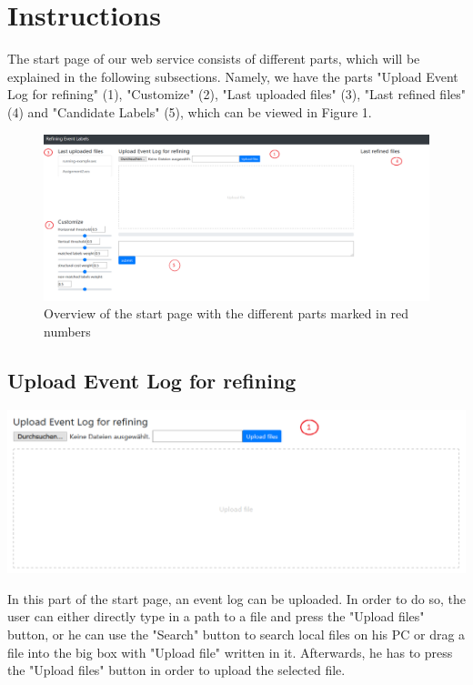 \documentclass[notitlepage]{article}
\begin{document}
\section{Instructions}

The start page of our web service consists of different parts, which will be explained in the following subsections. Namely, we have the parts "Upload Event Log for refining" (1), "Customize" (2), "Last uploaded files" (3), "Last refined files" (4) and "Candidate Labels" (5), which can be viewed in Figure 1.

\begin{figure}[h]
\includegraphics[scale=0.33]{startpage.png}
\caption{Overview of the start page with the different parts marked in red numbers}
\end{figure}

\subsection{Upload Event Log for refining}

\includegraphics[scale=0.5]{uploadEventLog.png}

In this part of the start page, an event log can be uploaded. In order to do so, the user can either directly type in a path to a file and press the "Upload files" button, or he can use the "Search" button to search local files on his PC or drag a file into the big box with "Upload file" written in it. 
Afterwards, he has to press the "Upload files" button in order to upload the selected file. 
\end{document}

